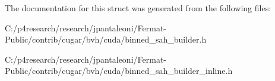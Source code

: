 The documentation for this struct was generated from the following files\+:\begin{DoxyCompactItemize}
\item 
C\+:/p4research/research/jpantaleoni/\+Fermat-\/\+Public/contrib/cugar/bvh/cuda/binned\+\_\+sah\+\_\+builder.\+h\item 
C\+:/p4research/research/jpantaleoni/\+Fermat-\/\+Public/contrib/cugar/bvh/cuda/binned\+\_\+sah\+\_\+builder\+\_\+inline.\+h\end{DoxyCompactItemize}
